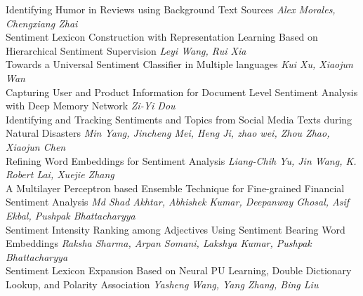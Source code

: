 \documentclass{book}
\begin{document}
    \noindent	Identifying Humor in Reviews using Background Text Sources \newline 
    {\itshape Alex Morales, Chengxiang Zhai} \\
    
    \noindent	Sentiment Lexicon Construction with Representation Learning Based on Hierarchical Sentiment Supervision \newline 
    {\itshape Leyi Wang, Rui Xia} \\
    
    \noindent	Towards a Universal Sentiment Classifier in Multiple languages \newline 
    {\itshape Kui Xu, Xiaojun Wan} \\
    
    \noindent	Capturing User and Product Information for Document Level Sentiment Analysis with Deep Memory Network \newline 
    {\itshape Zi-Yi Dou} \\
    
    \noindent	Identifying and Tracking Sentiments and Topics from Social Media Texts during Natural Disasters \newline 
    {\itshape Min Yang, Jincheng Mei, Heng Ji, zhao wei, Zhou Zhao, Xiaojun Chen} \\
    
    \noindent	Refining Word Embeddings for Sentiment Analysis \newline 
    {\itshape Liang-Chih Yu, Jin Wang, K. Robert Lai, Xuejie Zhang} \\
    
    \noindent	A Multilayer Perceptron based Ensemble Technique for Fine-grained Financial Sentiment Analysis \newline 
    {\itshape Md Shad Akhtar, Abhishek Kumar, Deepanway Ghosal, Asif Ekbal, Pushpak Bhattacharyya} \\
    
    \noindent	Sentiment Intensity Ranking among Adjectives Using Sentiment Bearing Word Embeddings \newline 
    {\itshape Raksha Sharma, Arpan Somani, Lakshya Kumar, Pushpak Bhattacharyya} \\
    
    \noindent	Sentiment Lexicon Expansion Based on Neural PU Learning, Double Dictionary Lookup, and Polarity Association \newline 
    {\itshape Yasheng Wang, Yang Zhang, Bing Liu} \\
    
\end{document}
